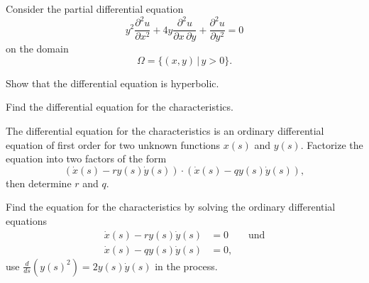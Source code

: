 Consider the partial differential equation
\begin{equation}
y^2\frac{\partial^2 u}{\partial x^2}
+4y\frac{\partial^2u}{\partial x\,\partial y}
+\frac{\partial^2 u}{\partial y^2}=0
\label{90000001:eqn}
\end{equation}
on the domain
\[
\Omega = \{ (x,y)\,|\, y >0\}.
\]
\begin{teilaufgaben}
\item
Show that the differential equation is hyperbolic.
\item
Find the differential equation for the characteristics.
\item
The differential equation for the characteristics is an ordinary
differential equation of first order for two unknown functions
$x(s)$ and $y(s)$.
Factorize the equation into two factors of the form
\[
(\dot x(s)-ry(s)\dot y(s))\cdot (\dot x(s)-qy(s)\dot y(s)),
\]
then determine $r$ and $q$.
\item
Find the equation for the characteristics by solving the ordinary
differential equations
\begin{align*}
\dot x(s) - ry(s)\dot y(s)&=0\qquad\text{und}\\
\dot x(s) - qy(s)\dot y(s)&=0,
\end{align*}
use 
$\frac{d}{ds}(y(s)^2)=2y(s)\dot y(s)$
in the process.
\end{teilaufgaben}

